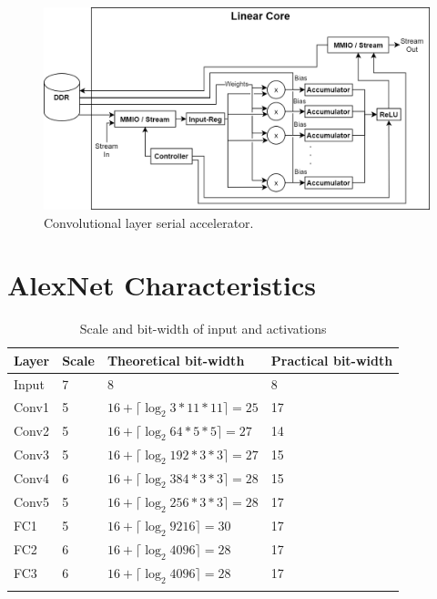 \begin{figure} [H]
	\centering
	\includegraphics[width=\textwidth]{Images/Platform/Linear_core_partial_outputs.png}
	\decoRule
	\caption[Convolutional layer serial accelerator]{Convolutional layer serial accelerator.}
	\label{fig:linear-core-partial-outputs}
\end{figure}


\section{AlexNet Characteristics}
\begin{table}[H]
	\caption{Scale and bit-width of input and activations}
	\label{tab:scale-and-bit-width-of-input-and-activations}
	\centering
	\begin{tabular}{llll}
		\toprule
		\textbf{Layer} & \textbf{Scale} & \textbf{Theoretical bit-width} & \textbf{Practical bit-width}\\
		\midrule
			Input & 7 & 8 & 8\\
			Conv1 & 5 & $16 + \lceil \log_2 3 * 11 * 11 \rceil = 25 $ & 17\\
			Conv2 & 5 & $16 + \lceil \log_2 64 * 5 * 5 \rceil = 27$ & 14\\
			Conv3 & 5 & $16 + \lceil \log_2 192 * 3 * 3 \rceil = 27$ & 15\\
			Conv4 & 6 & $16 + \lceil \log_2 384 * 3 * 3 \rceil = 28$ & 15\\
			Conv5 & 5 & $16 + \lceil \log_2 256 * 3 * 3 \rceil = 28$ & 17\\
			FC1 & 5 & $16 + \lceil \log_2 9216 \rceil = 30$ & 17\\
			FC2 & 6 & $16 + \lceil \log_2 4096 \rceil = 28$ & 17\\
			FC3 & 6 & $16 + \lceil \log_2 4096 \rceil = 28$ & 17\\
		\bottomrule\\
	\end{tabular}
\end{table}

